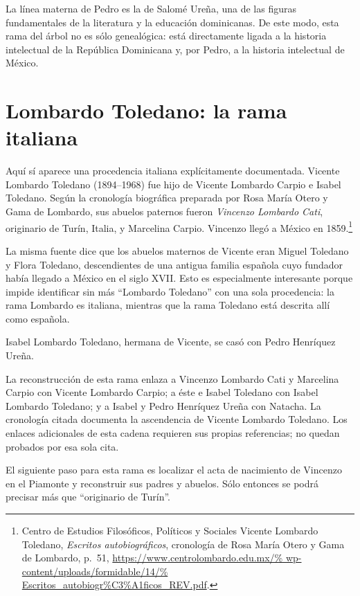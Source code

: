 La línea materna de Pedro es la de Salomé Ureña,
una de las figuras fundamentales de la literatura y
la educación dominicanas. De este modo, esta rama
del árbol no es sólo genealógica: está directamente
ligada a la historia intelectual de la República
Dominicana y, por Pedro, a la historia intelectual
de México.

\section{Lombardo Toledano: la rama italiana}
\label{section-genealogia-lombardo-toledano}

Aquí sí aparece una procedencia italiana
explícitamente documentada. Vicente Lombardo
Toledano (1894--1968) fue hijo de Vicente Lombardo
Carpio e Isabel Toledano. Según la cronología
biográfica preparada por Rosa María Otero y Gama de
Lombardo, sus abuelos paternos fueron \emph{Vincenzo
Lombardo Cati}, originario de Turín, Italia, y
Marcelina Carpio. Vincenzo llegó a México en
1859.\footnote{%
Centro de Estudios Filosóficos, Políticos y Sociales
Vicente Lombardo Toledano, \emph{Escritos
autobiográficos}, cronología de Rosa María Otero y
Gama de Lombardo, p.~51,
\url{https://www.centrolombardo.edu.mx/%
wp-content/uploads/formidable/14/%
Escritos_autobiogr\%C3\%A1ficos_REV.pdf}.}

La misma fuente dice que los abuelos maternos de
Vicente eran Miguel Toledano y Flora Toledano,
descendientes de una antigua familia española cuyo
fundador había llegado a México en el siglo XVII.
Esto es especialmente interesante porque impide
identificar sin más ``Lombardo Toledano'' con una
sola procedencia: la rama Lombardo es italiana,
mientras que la rama Toledano está descrita allí
como española.

Isabel Lombardo Toledano, hermana de Vicente, se
casó con Pedro Henríquez Ureña.

La reconstrucción de esta rama enlaza a
Vincenzo Lombardo Cati y Marcelina Carpio con
Vicente Lombardo Carpio; a éste e Isabel
Toledano con Isabel Lombardo Toledano; y a
Isabel y Pedro Henríquez Ureña con Natacha.
La cronología citada documenta la ascendencia
de Vicente Lombardo Toledano. Los enlaces
adicionales de esta cadena requieren sus
propias referencias; no quedan probados por
esa sola cita.



El siguiente paso para esta rama es localizar el
acta de nacimiento de Vincenzo en el Piamonte y
reconstruir sus padres y abuelos. Sólo entonces se
podrá precisar más que ``originario de Turín''.

